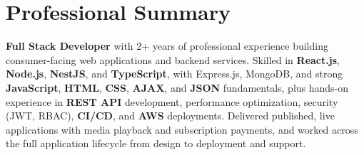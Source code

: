 \section{Professional Summary}
\vspace{2pt}

\textbf{Full Stack Developer} with 2+ years of professional experience building consumer-facing web applications and backend services. Skilled in \textbf{React.js}, \textbf{Node.js}, \textbf{NestJS}, and \textbf{TypeScript}, with Express.js, MongoDB, and strong \textbf{JavaScript}, \textbf{HTML}, \textbf{CSS}, \textbf{AJAX}, and \textbf{JSON} fundamentals, plus hands-on experience in \textbf{REST API} development, performance optimization, security (JWT, RBAC), \textbf{CI/CD}, and \textbf{AWS} deployments. Delivered published, live applications with media playback and subscription payments, and worked across the full application lifecycle from design to deployment and support.
